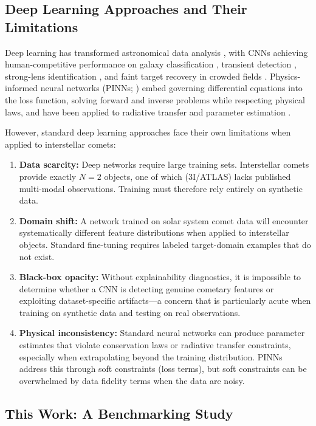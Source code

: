 \documentclass[preprint2]{aastex631}
\begin{document}
\subsection{Deep Learning Approaches and Their Limitations}

Deep learning has transformed astronomical data analysis \citep{baron19}, with CNNs achieving human-competitive performance on galaxy classification \citep{dieleman15}, transient detection \citep{goldstein15}, strong-lens identification \citep{lanusse18}, and faint target recovery in crowded fields \citep{jiang23}. Physics-informed neural networks (PINNs; \citealt{raissi19}) embed governing differential equations into the loss function, solving forward and inverse problems while respecting physical laws, and have been applied to radiative transfer \citep{mishra21,biswal25} and parameter estimation \citep{lu21}.

However, standard deep learning approaches face their own limitations when applied to interstellar comets:

\begin{enumerate}
    \item \textbf{Data scarcity:} Deep networks require large training sets. Interstellar comets provide exactly $N=2$ objects, one of which (3I/ATLAS) lacks published multi-modal observations. Training must therefore rely entirely on synthetic data.
    \item \textbf{Domain shift:} A network trained on solar system comet data will encounter systematically different feature distributions when applied to interstellar objects. Standard fine-tuning requires labeled target-domain examples that do not exist.
    \item \textbf{Black-box opacity:} Without explainability diagnostics, it is impossible to determine whether a CNN is detecting genuine cometary features or exploiting dataset-specific artifacts---a concern that is particularly acute when training on synthetic data and testing on real observations.
    \item \textbf{Physical inconsistency:} Standard neural networks can produce parameter estimates that violate conservation laws or radiative transfer constraints, especially when extrapolating beyond the training distribution. PINNs address this through soft constraints (loss terms), but soft constraints can be overwhelmed by data fidelity terms when the data are noisy.
\end{enumerate}

\subsection{This Work: A Benchmarking Study}
\end{document}
